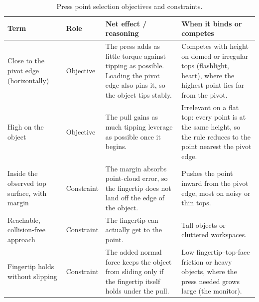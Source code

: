 \documentclass[10pt, conference]{IEEEtran}
\begin{document}
\begin{table}[t]
  \centering
  \caption{Press point selection objectives and constraints.}
  \label{tab:press_objectives}
  \small
  \begin{tabular}{p{} p{} p{} p{}}
    \toprule
    \textbf{Term} & \textbf{Role} & \textbf{Net effect / reasoning} & \textbf{When it binds or competes} \\
    \midrule
    Close to the pivot edge (horizontally) & Objective & The press adds as little torque against tipping as possible. Loading the pivot edge also pins it, so the object tips stably. & Competes with height on domed or irregular tops (flashlight, heart), where the highest point lies far from the pivot. \\
    High on the object & Objective & The pull gains as much tipping leverage as possible once it begins. & Irrelevant on a flat top: every point is at the same height, so the rule reduces to the point nearest the pivot edge. \\
    Inside the observed top surface, with margin & Constraint & The margin absorbs point-cloud error, so the fingertip does not land off the edge of the object. & Pushes the point inward from the pivot edge, most on noisy or thin tops. \\
    Reachable, collision-free approach & Constraint & The fingertip can actually get to the point. & Tall objects or cluttered workspaces. \\
    Fingertip holds without slipping & Constraint & The added normal force keeps the object from sliding only if the fingertip itself holds under the pull. & Low fingertip--top-face friction or heavy objects, where the press needed grows large (the monitor). \\
    \bottomrule
  \end{tabular}
\end{table}
\end{document}
